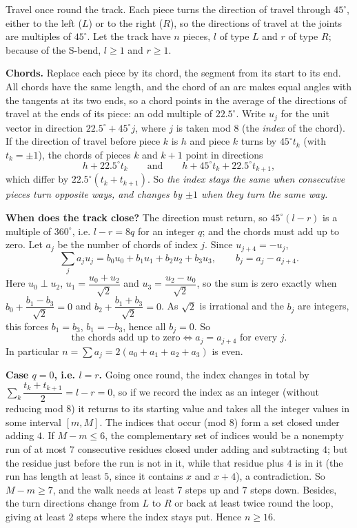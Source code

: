Travel once round the track. Each piece turns the direction of travel through $45^\circ$, either to the left ($L$) or to the right ($R$), so the directions of travel at the joints are multiples of $45^\circ$. Let the track have $n$ pieces, $l$ of type $L$ and $r$ of type $R$; because of the S-bend, $l\ge1$ and $r\ge1$.

\textbf{Chords.} Replace each piece by its chord, the segment from its start to its end. All chords have the same length, and the chord of an arc makes equal angles with the tangents at its two ends, so a chord points in the average of the directions of travel at the ends of its piece: an odd multiple of $22.5^\circ$. Write $u_j$ for the unit vector in direction $22.5^\circ+45^\circ j$, where $j$ is taken mod $8$ (the \emph{index} of the chord). If the direction of travel before piece $k$ is $h$ and piece $k$ turns by $45^\circ t_k$ (with $t_k=\pm1$), the chords of pieces $k$ and $k+1$ point in directions
\[h+22.5^\circ t_k\qquad\text{and}\qquad h+45^\circ t_k+22.5^\circ t_{k+1},\]
which differ by $22.5^\circ(t_k+t_{k+1})$. So \emph{the index stays the same when consecutive pieces turn opposite ways, and changes by $\pm1$ when they turn the same way.}

\textbf{When does the track close?} The direction must return, so $45^\circ(l-r)$ is a multiple of $360^\circ$, i.e. $l-r=8q$ for an integer $q$; and the chords must add up to zero. Let $a_j$ be the number of chords of index $j$. Since $u_{j+4}=-u_j$,
\[\sum_j a_ju_j=b_0u_0+b_1u_1+b_2u_2+b_3u_3,\qquad b_j=a_j-a_{j+4}.\]
Here $u_0\perp u_2$, $u_1=\dfrac{u_0+u_2}{\sqrt2}$ and $u_3=\dfrac{u_2-u_0}{\sqrt2}$, so the sum is zero exactly when $b_0+\dfrac{b_1-b_3}{\sqrt2}=0$ and $b_2+\dfrac{b_1+b_3}{\sqrt2}=0$. As $\sqrt2$ is irrational and the $b_j$ are integers, this forces $b_1=b_3$, $b_1=-b_3$, hence all $b_j=0$. So
\[\text{the chords add up to zero}\iff a_j=a_{j+4}\text{ for every }j.\]
In particular $n=\sum a_j=2(a_0+a_1+a_2+a_3)$ is even.

\textbf{Case $q=0$, i.e. $l=r$.} Going once round, the index changes in total by $\sum_k\dfrac{t_k+t_{k+1}}{2}=l-r=0$, so if we record the index as an integer (without reducing mod $8$) it returns to its starting value and takes all the integer values in some interval $[m,M]$. The indices that occur (mod $8$) form a set closed under adding $4$. If $M-m\le6$, the complementary set of indices would be a nonempty run of at most $7$ consecutive residues closed under adding and subtracting $4$; but the residue just before the run is not in it, while that residue plus $4$ is in it (the run has length at least $5$, since it contains $x$ and $x+4$), a contradiction. So $M-m\ge7$, and the walk needs at least $7$ steps up and $7$ steps down. Besides, the turn directions change from $L$ to $R$ or back at least twice round the loop, giving at least $2$ steps where the index stays put. Hence $n\ge16$.

